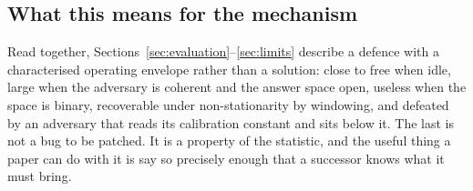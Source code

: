\subsection{What this means for the mechanism}

Read together, Sections~\ref{sec:evaluation}--\ref{sec:limits} describe a defence
with a characterised operating envelope rather than a solution: close to free
when idle, large when the adversary is coherent and the answer space open,
useless when the space is binary, recoverable under non-stationarity by
windowing, and defeated by an adversary that reads its calibration constant and
sits below it. The last is not a bug to be patched. It is a property of the
statistic, and the useful thing a paper can do with it is say so precisely enough
that a successor knows what it must bring.
